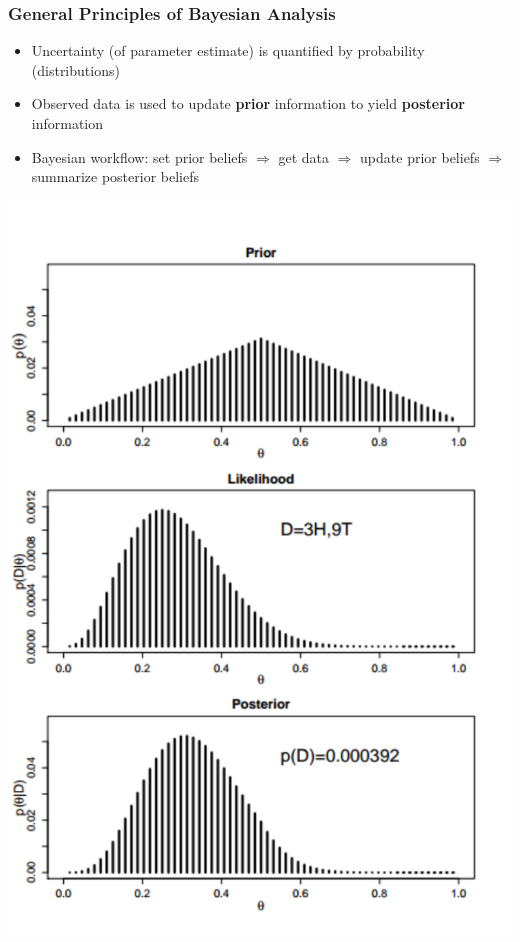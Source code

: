 \documentclass[hyperref={pdfpagelabels=false},unknownkeysallowed]{beamer}
\begin{document}
\begin{frame}
\frametitle{General Principles of Bayesian Analysis}
\begin{itemize}
	\item Uncertainty (of parameter estimate) is quantified by probability (distributions)
	\item Observed data is used to update \textbf{prior} information to yield  \textbf{posterior} information
	\item Bayesian workflow: set prior beliefs $\Rightarrow$ get data $\Rightarrow$ update prior beliefs  $\Rightarrow$ summarize posterior beliefs

\end{itemize} 

\begin{center}
\includegraphics[scale=0.2]{priorlikelihoodposterior.pdf} 
\end{center}
\note{}
\end{frame}
\end{document}
